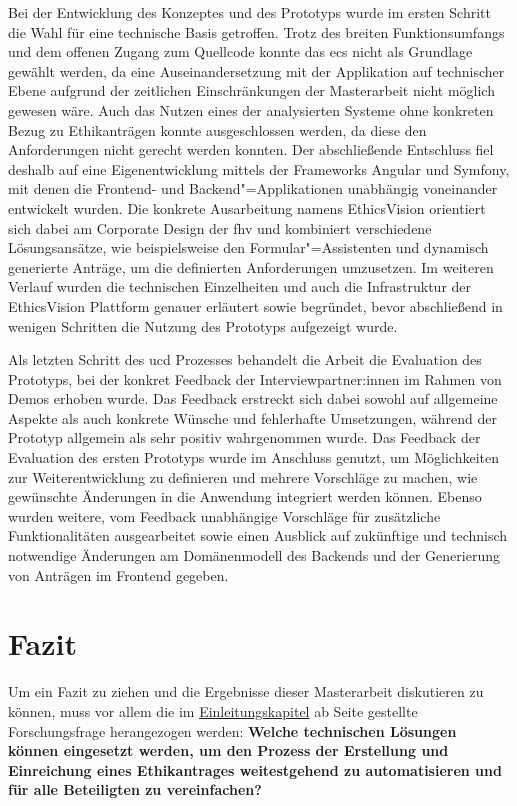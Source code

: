 \documentclass[a4paper,12pt,twoside]{scrreprt}
\begin{document}
Bei der Entwicklung des Konzeptes und des Prototyps wurde im ersten Schritt die Wahl für eine technische Basis getroffen. Trotz des breiten Funktionsumfangs und dem offenen Zugang zum Quellcode konnte das \ac{ecs} nicht als Grundlage gewählt werden, da eine Auseinandersetzung mit der Applikation auf technischer Ebene aufgrund der zeitlichen Einschränkungen der Masterarbeit nicht möglich gewesen wäre. Auch das Nutzen eines der analysierten Systeme ohne konkreten Bezug zu Ethikanträgen konnte ausgeschlossen werden, da diese den Anforderungen nicht gerecht werden konnten. Der abschließende Entschluss fiel deshalb auf eine Eigenentwicklung mittels der Frameworks Angular und Symfony, mit denen die Frontend- und Backend"=Applikationen unabhängig voneinander entwickelt wurden. Die konkrete Ausarbeitung namens EthicsVision orientiert sich dabei am Corporate Design der \ac{fhv} und kombiniert verschiedene Lösungsansätze, wie beispielsweise den Formular"=Assistenten und dynamisch generierte Anträge, um die definierten Anforderungen umzusetzen. Im weiteren Verlauf wurden die technischen Einzelheiten und auch die Infrastruktur der EthicsVision Plattform genauer erläutert sowie begründet, bevor abschließend in wenigen Schritten die Nutzung des Prototyps aufgezeigt wurde.

\medskip

Als letzten Schritt des \ac{ucd} Prozesses behandelt die Arbeit die Evaluation des Prototyps, bei der konkret Feedback der Interviewpartner:innen im Rahmen von Demos erhoben wurde. Das Feedback erstreckt sich dabei sowohl auf allgemeine Aspekte als auch konkrete Wünsche und fehlerhafte Umsetzungen, während der Prototyp allgemein als sehr positiv wahrgenommen wurde. Das Feedback der Evaluation des ersten Prototyps wurde im Anschluss genutzt, um Möglichkeiten zur Weiterentwicklung zu definieren und mehrere Vorschläge zu machen, wie gewünschte Änderungen in die Anwendung integriert werden können. Ebenso wurden weitere, vom Feedback unabhängige Vorschläge für zusätzliche Funktionalitäten ausgearbeitet sowie einen Ausblick auf zukünftige und technisch notwendige Änderungen am Domänenmodell des Backends und der Generierung von Anträgen im Frontend gegeben.

\section{Fazit}
\label{sec:fazit}

Um ein Fazit zu ziehen und die Ergebnisse dieser Masterarbeit diskutieren zu können, muss vor allem die im \hyperref[chap:einleitung]{Einleitungskapitel} ab Seite \pageref{chap:einleitung} gestellte Forschungsfrage herangezogen werden:\newline
\textbf{Welche technischen Lösungen können eingesetzt werden, um den Prozess der Erstellung und Einreichung eines Ethikantrages weitestgehend zu automatisieren und für alle Beteiligten zu vereinfachen?}
\end{document}
